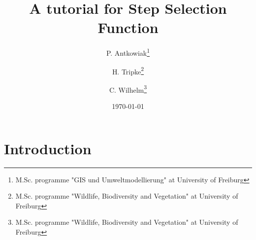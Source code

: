 \documentclass[11pt, a4paper]{article}\usepackage[]{graphicx}\usepackage[]{color}
\begin{document}



\title{A tutorial for Step Selection Function}

\author{P. Antkowiak\thanks{M.Sc. programme "GIS und Umweltmodellierung" at University of Freiburg} \and H. Tripke\thanks{M.Sc. programme "Wildlife, Biodiversity and Vegetation" at University of Freiburg} \and C. Wilhelm\thanks{M.Sc. programme "Wildlife, Biodiversity and Vegetation" at University of Freiburg}}

\date{\today} %

\maketitle


\tableofcontents

\newpage

\section{Introduction}%
\end{document}
